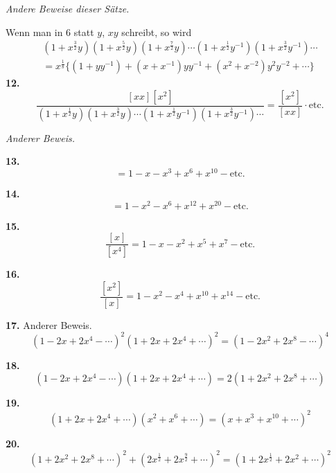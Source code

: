 \documentclass[10pt,a4paper]{article}
\begin{document}
\textit{Andere Beweise dieser Sätze.}

Wenn man in 6 statt $y$, $xy$ schreibt, so wird
%
\begin{multline*}
(1 + x^{\frac{3}{2}}y)(1 + x^{\frac{5}{2}}y)(1 + x^{\frac{7}{2}}y) \cdots (1 + x^{\frac{1}{2}}y^{-1})(1 + x^{\frac{3}{2}}y^{-1}) \cdots \\
= x^{\frac{1}{8}} \bigl\{(1 + yy^{-1}) + (x + x^{-1})yy^{-1} + (x^2 + x^{-2})y^2y^{-2} + \cdots\bigr\}
\end{multline*}
%
\textbf{12.}
\begin{equation*}
\frac{[xx][x^2]}{(1 + x^{\frac{1}{2}}y)(1 + x^{\frac{3}{2}}y) \cdots (1 + x^{\frac{1}{2}}y^{-1})(1 + x^{\frac{3}{2}}y^{-1}) \cdots} =
\frac{[x^2]}{[xx]} \cdot \text{etc.}
\end{equation*}

\textit{Anderer Beweis.}

\textbf{13.}
\begin{equation*}
[x][xx] = 1 - x - x^3 + x^6 + x^{10} - \text{etc.}
\end{equation*}

\textbf{14.}
\begin{equation*}
[x^2] = 1 - x^2 - x^6 + x^{12} + x^{20} - \text{etc.}
\end{equation*}

\textbf{15.}
\begin{equation*}
\frac{[x]}{[x^4]} = 1 - x - x^2 + x^5 + x^7 - \text{etc.}
\end{equation*}

\textbf{16.}
\begin{equation*}
\frac{[x^2]}{[x]} = 1 - x^2 - x^4 + x^{10} + x^{14} - \text{etc.}
\end{equation*}

\textbf{17.} Anderer Beweis.
%
\begin{equation*}
(1 - 2x + 2x^4 - \cdots)^2 (1 + 2x + 2x^4 + \cdots)^2 =
(1 - 2x^2 + 2x^8 - \cdots)^4
\end{equation*}

\textbf{18.}
\begin{equation*}
(1 - 2x + 2x^4 - \cdots)(1 + 2x + 2x^4 + \cdots) = 2(1 + 2x^2 + 2x^8 + \cdots)
\end{equation*}

\textbf{19.}
\begin{equation*}
(1 + 2x + 2x^4 + \cdots)(x^2 + x^6 + \cdots) = (x + x^3 + x^{10} + \cdots)^2
\end{equation*}

\textbf{20.}
\begin{equation*}
(1 + 2x^2 + 2x^8 + \cdots)^2 + (2x^{\frac{1}{2}} + 2x^{\frac{9}{2}} + \cdots)^2 =
(1 + 2x^{\frac{1}{2}} + 2x^2 + \cdots)^2
\end{equation*}
\end{document}
